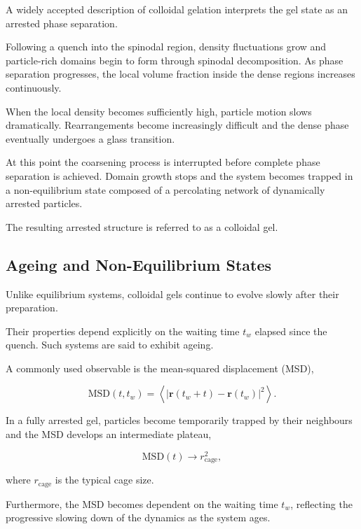 \documentclass[11pt,a4paper]{article}
\begin{document}
A widely accepted description of colloidal gelation interprets the gel state as an arrested phase separation.

Following a quench into the spinodal region, density fluctuations grow and particle-rich domains begin to form through spinodal decomposition. As phase separation progresses, the local volume fraction inside the dense regions increases continuously.

When the local density becomes sufficiently high, particle motion slows dramatically. Rearrangements become increasingly difficult and the dense phase eventually undergoes a glass transition.

At this point the coarsening process is interrupted before complete phase separation is achieved. Domain growth stops and the system becomes trapped in a non-equilibrium state composed of a percolating network of dynamically arrested particles.

The resulting arrested structure is referred to as a colloidal gel.

\subsection{Ageing and Non-Equilibrium States}

Unlike equilibrium systems, colloidal gels continue to evolve slowly after their preparation.

Their properties depend explicitly on the waiting time $t_w$ elapsed since the quench. Such systems are said to exhibit ageing.

A commonly used observable is the mean-squared displacement (MSD),

\begin{equation}
\mathrm{MSD}(t,t_w)
=
\left\langle
\left|
\mathbf r(t_w+t)-\mathbf r(t_w)
\right|^2
\right\rangle.
\end{equation}

In a fully arrested gel, particles become temporarily trapped by their neighbours and the MSD develops an intermediate plateau,

\begin{equation}
\mathrm{MSD}(t)
\rightarrow
r_{\mathrm{cage}}^2,
\end{equation}

where $r_{\mathrm{cage}}$ is the typical cage size.

Furthermore, the MSD becomes dependent on the waiting time $t_w$, reflecting the progressive slowing down of the dynamics as the system ages.
\end{document}
